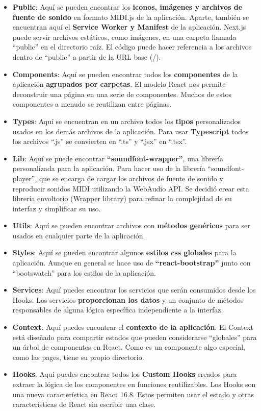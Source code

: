 \documentclass[12pt,twoside,titlepage]{report}
\begin{document}
\begin{itemize}
    \item \textbf{Public}: Aquí se pueden encontrar los \textbf{iconos, imágenes y archivos de fuente de sonido} en formato MIDI.js de la aplicación. Aparte, también se encuentran aquí el \textbf{Service Worker y Manifest} de la aplicación. Next.js puede servir archivos estáticos, como imágenes, en una carpeta llamada ``public'' en el directorio raíz. El código puede hacer referencia a los archivos dentro de ``public'' a partir de la URL base (/).
    \item \textbf{Components}: Aquí se pueden encontrar todos los \textbf{componentes} de la aplicación \textbf{agrupados por carpetas}. El modelo React nos permite deconstruir una página en una serie de componentes. Muchos de estos componentes a menudo se reutilizan entre páginas.
    \item \textbf{Types}: Aquí se encuentran en un archivo todos los \textbf{tipos} personalizados usados en los demás archivos de la aplicación. Para usar \textbf{Typescript} todos los archivos ``.js'' se convierten en ``.ts'' y ``.jsx'' en ``.tsx''.
    \item \textbf{Lib}: Aquí se puede encontrar \textbf{``soundfont-wrapper''}, una librería personalizada para la aplicación. Para hacer uso de la librería ``soundfont-player'', que se encarga de cargar los archivos de fuente de sonido y reproducir sonidos MIDI utilizando la WebAudio API. Se decidió crear esta librería envoltorio (Wrapper library) para refinar la complejidad de su interfaz y simplificar su uso.
    \item \textbf{Utils}: Aquí se pueden encontrar archivos con \textbf{métodos genéricos} para ser usados en cualquier parte de la aplicación.
    \item \textbf{Styles}: Aquí se pueden encontrar algunos \textbf{estilos css globales} para la aplicación. Aunque en general se hace uso de \textbf{``react-bootstrap''} junto con ``bootswatch'' para los estilos de la aplicación.
    \item \textbf{Services}: Aquí puedes encontrar los servicios que serán consumidos desde los Hooks. Los servicios \textbf{proporcionan los datos} y un conjunto de métodos responsables de alguna lógica específica independiente a la interfaz.
    \item \textbf{Context}: Aquí puedes encontrar el \textbf{contexto de la aplicación}. El Context está diseñado para compartir estados que pueden considerarse “globales” para un árbol de componentes en React. Como es un componente algo especial, como las pages, tiene su propio directorio.
    \item \textbf{Hooks}: Aquí puedes encontrar todos los \textbf{Custom Hooks} creados para extraer la lógica de los componentes en funciones reutilizables. Los Hooks son una nueva característica en React 16.8. Estos permiten usar el estado y otras características de React sin escribir una clase.
\end{itemize}
\end{document}
